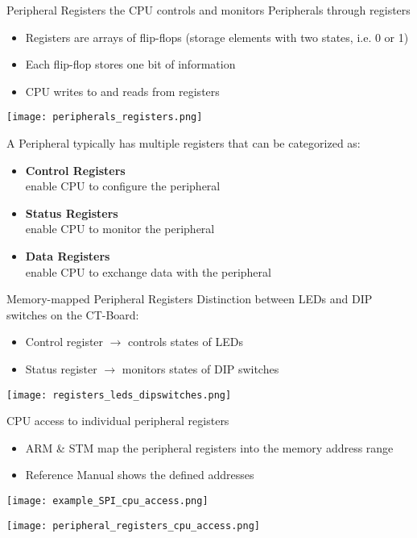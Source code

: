 \begin{definition}{Peripheral Registers}
    the CPU controls and monitors Peripherals through registers
    \begin{itemize}
        \item Registers are arrays of flip-flops (storage elements with two states, i.e. 0 or 1)
        \item Each flip-flop stores one bit of information
        \item CPU writes to and reads from registers
    \end{itemize}
    \texttt{[image: peripherals\_registers.png]}

    \tcblower
    A Peripheral typically has multiple registers that can be categorized as:
    \begin{itemize}
        \item \textbf{Control Registers} \\
        enable CPU to configure the peripheral
        \item \textbf{Status Registers} \\
        enable CPU to monitor the peripheral
        \item \textbf{Data Registers} \\
        enable CPU to exchange data with the peripheral
    \end{itemize}
\end{definition}

\begin{definition}{Memory-mapped Peripheral Registers}
    Distinction between LEDs and DIP switches on the CT-Board:
    \begin{itemize}
        \item Control register $\rightarrow$ controls states of LEDs
        \item Status register $\rightarrow$ monitors states of DIP switches
    \end{itemize}
    \texttt{[image: registers\_leds\_dipswitches.png]}
\end{definition}

\begin{concept}{CPU access to individual peripheral registers}
    \begin{itemize}
        \item ARM \& STM map the peripheral registers into
        the memory address range
        \item Reference Manual shows the defined addresses
    \end{itemize}
    \texttt{[image: example\_SPI\_cpu\_access.png]}

    \texttt{[image: peripheral\_registers\_cpu\_access.png]}

\end{concept}

